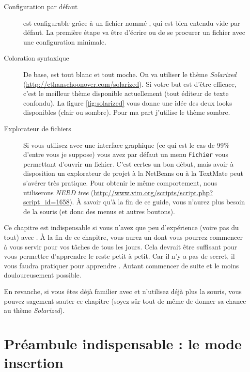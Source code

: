 \begin{description}
    \item[Configuration par défaut] \vim est configurable grâce à un fichier nommé \vimrc, qui est bien entendu vide par défaut. La première étape va être d'écrire ou de se procurer un fichier \vimrc avec une configuration minimale.
    \item[Coloration syntaxique] De base, \vim est tout blanc et tout moche. On va utiliser le thème \emph{Solarized} (\url{http://ethanschoonover.com/solarized}). Si votre but est d'être efficace, c'est le meilleur thème disponible actuellement (tout éditeur de texte confondu). La figure \ref{fig:solarized} vous donne une idée des deux looks disponibles (clair ou sombre). Pour ma part j'utilise le thème sombre.
    \item[Explorateur de fichiers] Si vous utilisez \vim avec une interface graphique (ce qui est le cas de 99\% d'entre vous je suppose) vous avez par défaut un menu \Verb|Fichier| vous permettant d'ouvrir un fichier. C'est certes un bon début, mais avoir à disposition un explorateur de projet à la NetBeans ou à la TextMate peut s'avérer très pratique. Pour obtenir le même comportement, nous utiliserons \emph{NERD tree} (\url{http://www.vim.org/scripts/script.php?script_id=1658}). À savoir qu'à la fin de ce guide, vous n'aurez plus besoin de la souris (et donc des menus et autres boutons).
\end{description}

Ce chapitre est indispensable si vous n'avez que peu d'expérience (voire pas du tout) avec \vim. À la fin de ce chapitre, vous aurez un \vim dont vous pourrez commencer à vous servir pour vos tâches de tous les jours. Cela devrait être suffisant pour vous permettre d'apprendre le reste petit à petit. Car il n'y a pas de secret, il vous faudra pratiquer pour apprendre \vim. Autant commencer de suite et le moins douloureusement possible.

En revanche, si vous êtes déjà familier avec \vim et n'utilisez déjà plus la souris, vous pouvez sagement sauter ce chapitre (soyez sûr tout de même de donner sa chance au thème \emph{Solarized}).

\section{Préambule indispensable : le mode insertion}\label{sec:modeinsertion}

